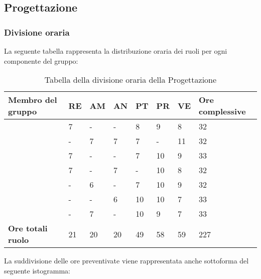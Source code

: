 \newpage
\subsection{Progettazione}

\subsubsection{Divisione oraria}
La seguente tabella rappresenta la distribuzione oraria dei ruoli per ogni componente del gruppo:
\renewcommand{\arraystretch}{2}
\begin{longtable}[h!] { C{4cm} C{1cm} C{1cm} C{1cm} C{1cm} C{1cm} C{1cm} C{3cm}}
\caption{Tabella della divisione oraria della Progettazione}\\
\rowcolor{\primaryColor}

\textcolor{\secondaryColor}{\textbf{Membro del gruppo}} & 
\textcolor{\secondaryColor}{\textbf{RE}} & 
\textcolor{\secondaryColor}{\textbf{AM}} & 
\textcolor{\secondaryColor}{\textbf{AN}} & 
\textcolor{\secondaryColor}{\textbf{PT}} & 
\textcolor{\secondaryColor}{\textbf{PR}} & 
\textcolor{\secondaryColor}{\textbf{VE}} & 
\textcolor{\secondaryColor}{\textbf{Ore complessive}}\\	
\endhead
        
\AW{}                     & 7  & - & - & 8 & 9 & 8 & 32 \\
\AT{}                     & -  & 7 & 7 & 7 & - & 11 & 32 \\
\AD{}                     & 7  & - & - & 7 & 10 & 9 & 33 \\
\EC{}                     & 7  & - & 7 & - & 10 & 8 & 32 \\
\EM{}                     & -  & 6 & - & 7 & 10 & 9 & 32 \\
\FP{}                     & -  & - & 6 & 10 & 10 & 7 & 33 \\
\GG{}                     & -  & 7 & - & 10 & 9 & 7 & 33 \\
\textbf{Ore totali ruolo} & 21 & 20 & 20 & 49 & 58 & 59 & 227 \\

		
\end{longtable}
La suddivisione delle ore preventivate viene rappresentata anche sottoforma del seguente istogramma:
